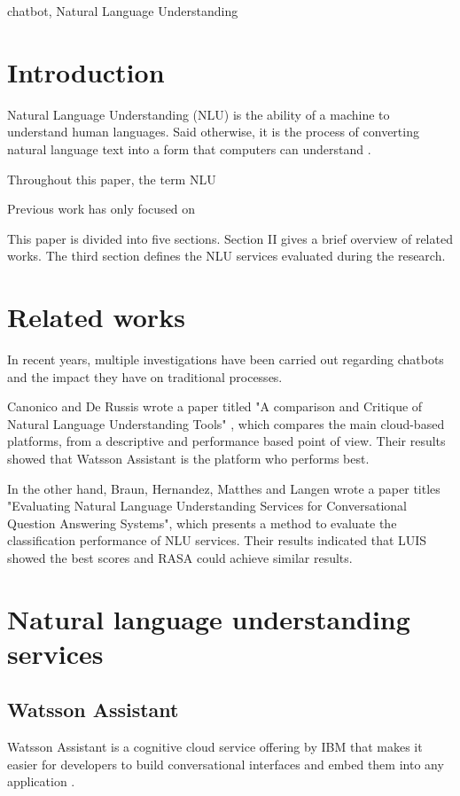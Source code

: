 \documentclass[conference]{IEEEtran}
\begin{document}
\begin{IEEEkeywords}
    chatbot, Natural Language Understanding
\end{IEEEkeywords}

\section{Introduction}
Natural Language Understanding (NLU) is the ability of a machine to understand human languages. Said otherwise, it is the process of converting natural language text into a form that computers can understand \cite{pathak2017artificial}.

Throughout this paper, the term NLU

Previous work has only focused on

This paper is divided into five sections. Section II gives a brief overview of related works. The third section defines the NLU services evaluated during the research.

\section{Related works}
In recent years, multiple investigations have been carried out regarding chatbots and the impact they have on traditional processes.

Canonico and De Russis wrote a paper titled "A comparison and Critique of Natural Language Understanding Tools" \cite{Canonico2018}, which compares the main cloud-based platforms, from a descriptive and performance based point of view. Their results showed that Watsson Assistant is the platform who performs best.

In the other hand, Braun, Hernandez, Matthes and Langen wrote a paper titles "Evaluating Natural Language Understanding Services for Conversational Question Answering Systems", which presents a method to evaluate the classification performance of NLU services. Their results indicated that LUIS showed the best scores and RASA could achieve similar results.



\section{Natural language understanding services}
\subsection{Watsson Assistant}
Watsson Assistant is a cognitive cloud service offering by IBM that makes it easier for developers to build conversational interfaces and embed them into any application \cite{sabharwal2019developing}.
\end{document}
